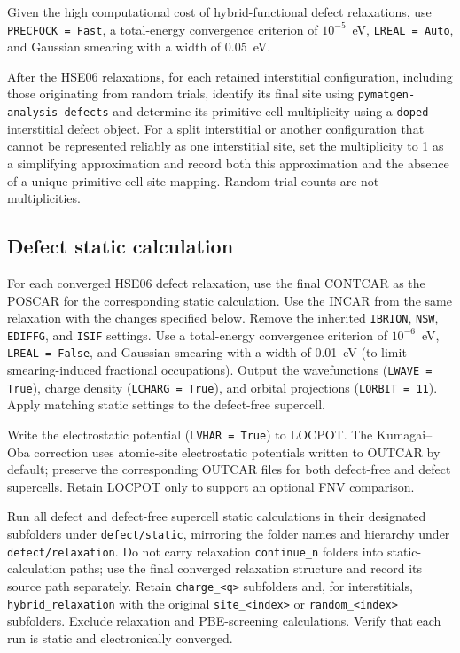 \documentclass[aip,jap,reprint,amsmath,amssymb]{revtex4-2}
\begin{document}
Given the high computational cost of hybrid-functional defect relaxations, use \texttt{PRECFOCK = Fast}, a total-energy convergence criterion of $10^{-5}$~eV, \texttt{LREAL = Auto}, and Gaussian smearing with a width of 0.05~eV.

After the HSE06 relaxations, for each retained interstitial configuration, including those originating from random trials, identify its final site using \texttt{pymatgen-analysis-defects} and determine its primitive-cell multiplicity using a \texttt{doped} interstitial defect object. For a split interstitial or another configuration that cannot be represented reliably as one interstitial site, set the multiplicity to 1 as a simplifying approximation and record both this approximation and the absence of a unique primitive-cell site mapping. Random-trial counts are not multiplicities.

\subsection{Defect static calculation}

For each converged HSE06 defect relaxation, use the final CONTCAR as the POSCAR for the corresponding static calculation. Use the INCAR from the same relaxation with the changes specified below. Remove the inherited \texttt{IBRION}, \texttt{NSW}, \texttt{EDIFFG}, and \texttt{ISIF} settings. Use a total-energy convergence criterion of $10^{-6}$~eV, \texttt{LREAL = False}, and Gaussian smearing with a width of 0.01~eV (to limit smearing-induced fractional occupations). Output the wavefunctions (\texttt{LWAVE = True}), charge density (\texttt{LCHARG = True}), and orbital projections (\texttt{LORBIT = 11}). Apply matching static settings to the defect-free supercell.

Write the electrostatic potential (\texttt{LVHAR = True}) to LOCPOT. The Kumagai--Oba correction uses atomic-site electrostatic potentials written to OUTCAR by default; preserve the corresponding OUTCAR files for both defect-free and defect supercells.\cite{Kumagai2014} Retain LOCPOT only to support an optional FNV comparison.\cite{Freysoldt2009}

Run all defect and defect-free supercell static calculations in their designated subfolders under \texttt{defect/\allowbreak static}, mirroring the folder names and hierarchy under \texttt{defect/\allowbreak relaxation}. Do not carry relaxation \texttt{continue\_n} folders into static-calculation paths; use the final converged relaxation structure and record its source path separately. Retain \texttt{charge\_<q>} subfolders and, for interstitials, \texttt{hybrid\_relaxation} with the original \texttt{site\_<index>} or \texttt{random\_<index>} subfolders. Exclude relaxation and PBE-screening calculations. Verify that each run is static and electronically converged.
\end{document}
